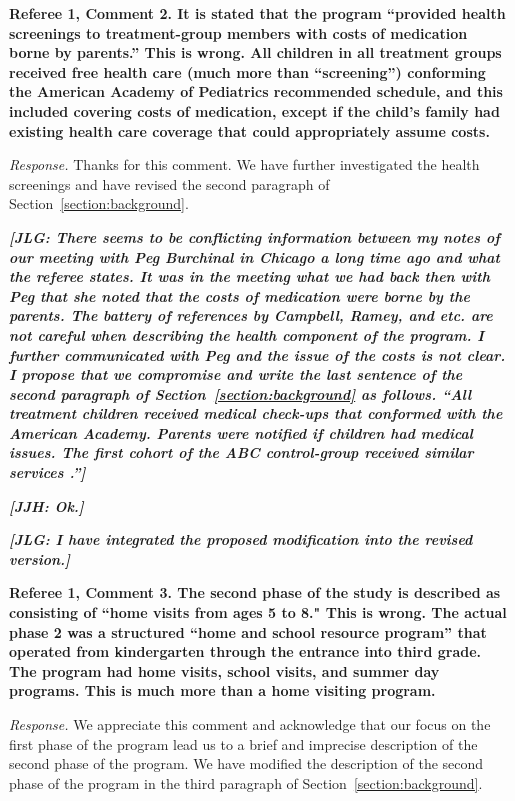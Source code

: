 \noindent \textbf{Referee 1, Comment 2. It is stated that the program ``provided health screenings to treatment-group members with costs of medication borne by parents.'' This is wrong. All children in all treatment groups received free health care (much more than ``screening'') conforming the American Academy of Pediatrics recommended schedule, and this included covering costs of medication, except if the child's family had existing health care coverage that could appropriately assume costs.}

\noindent \textit{Response.} Thanks for this comment. We have further investigated the health screenings and have revised the second paragraph of Section~\ref{section:background}.

\textit{\textbf{[JLG: There seems to be conflicting information between my notes of our meeting with Peg Burchinal in Chicago a long time ago and what the referee states. It was in the meeting what we had back then with Peg that she noted that the costs of medication were borne by the parents. The battery of references by Campbell, Ramey, and etc. are not careful when describing the health component of the program. I further communicated with Peg and the issue of the costs is not clear. I propose that we compromise and write the last sentence of the second paragraph of Section~\ref{section:background} as follows. ``All treatment children received medical check-ups that conformed with the American Academy. Parents were notified if children had medical issues. The first cohort of the ABC control-group received similar services \citep{Campbell_Conti_etal_2014_EarlyChildhoodInvestments,Henderson-et-al_1982_NEJoM}.'']}}

\textit{\textbf{[JJH: Ok.]}}

\textit{\textbf{[JLG: I have integrated the proposed modification into the revised version.]}}

\noindent \textbf{Referee 1, Comment 3. The second phase of the study is described as consisting of ``home visits from ages 5 to 8." This is wrong. The actual phase 2 was a structured ``home and school resource program'' that operated from kindergarten through the entrance into third grade. The program had home visits, school visits, and summer day programs. This is much more than a home visiting program.}

\noindent \textit{Response.} We appreciate this comment and acknowledge that our focus on the first phase of the program lead us to a brief and imprecise description of the second phase of the program. We have modified the description of the second phase of the program in the third paragraph of Section~\ref{section:background}.

